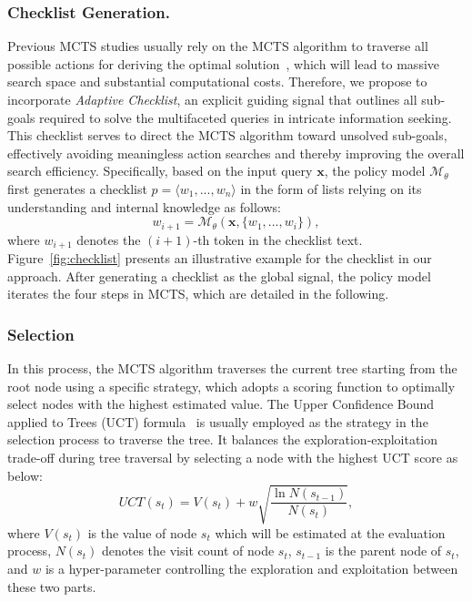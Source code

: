 \subsubsection{Checklist Generation.} Previous MCTS studies usually rely on the MCTS algorithm to traverse all possible actions for deriving the optimal solution~\cite{alphago, YeLKAG21}, which will lead to massive search space and substantial computational costs. Therefore, we propose to incorporate \emph{Adaptive Checklist}, an explicit guiding signal that outlines all sub-goals required to solve the multifaceted queries in intricate information seeking. This checklist serves to direct the MCTS algorithm toward unsolved sub-goals, effectively avoiding meaningless action searches and thereby improving the overall search efficiency. Specifically, based on the input query $\bm{x}$, the policy model $\mathcal{M}_\theta$ first generates a checklist $p = \langle w_1,...,w_n \rangle $ in the form of lists relying on its understanding and internal knowledge as follows:
\begin{equation}
    w_{i+1} = \mathcal{M}_\theta(\bm{x}, \{w_1,...,w_i\}),
\end{equation}
where $w_{i+1}$ denotes the $(i+1)$-th token in the checklist text. Figure~\ref{fig:checklist} presents an illustrative example for the checklist in our approach. After generating a checklist as the global signal, the policy model iterates the four steps in MCTS, which are detailed in the following. 

\subsubsection{Selection}
In this process, the MCTS algorithm traverses the current tree starting from the root node using a specific strategy, which adopts a scoring function to optimally select nodes with the highest estimated value. The Upper Confidence Bound applied to Trees (UCT) formula~\cite{uct} is usually employed as the strategy in the selection process to traverse the tree. It balances the exploration-exploitation trade-off during tree traversal by selecting a node with the highest UCT score as below:
\begin{equation}
    UCT(s_t) = V(s_t) + w\sqrt{\frac{\ln{N(s_{t-1})}}{N(s_t)}},
\end{equation}
where $V(s_t)$ is the value of node $s_t$ which will be estimated at the evaluation process, $N(s_t)$ denotes the visit count of node $s_t$, $s_{t-1}$ is the parent node of $s_t$, and $w$ is a hyper-parameter controlling the exploration and exploitation between these two parts.

